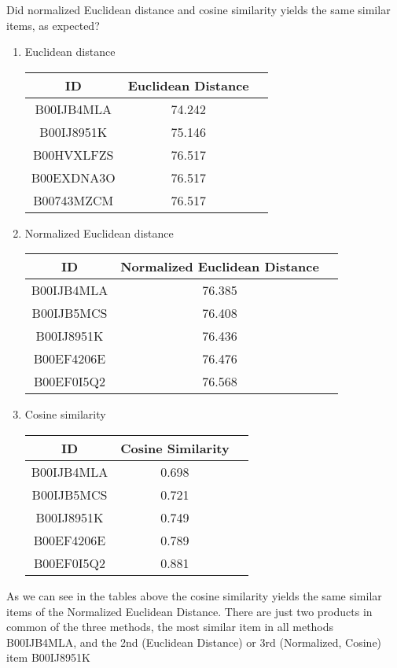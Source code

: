 \documentclass{article}
\def\blu#1{{\color{blu}#1}}
\def\ans#1{{\color{ans}#1}}
\begin{document}
\blu{Did normalized Euclidean distance and cosine similarity yields the same similar items, as expected?}

\begin{enumerate}\color{ans}
\item Euclidean distance
    \scriptsize
    \setlength{\tabcolsep}{10pt}
    \begin{center}
    \begin{tabular}{SSS} \toprule
        {ID} & {Euclidean Distance} & \\ \midrule
        {B00IJB4MLA} & 74.242 \\ 
        {B00IJ8951K} & 75.146 \\ 
        {B00HVXLFZS} & 76.517 \\ 
        {B00EXDNA3O} & 76.517 \\ 
        {B00743MZCM} & 76.517 \\ \bottomrule
    \end{tabular}
    \end{center}
    \normalsize
\item Normalized Euclidean distance
    \scriptsize
    \setlength{\tabcolsep}{10pt}
    \begin{center}
    \begin{tabular}{SSS} \toprule
        {ID} & {Normalized Euclidean Distance} & \\ \midrule
        {B00IJB4MLA} & 76.385 \\ 
        {B00IJB5MCS} & 76.408 \\ 
        {B00IJ8951K} & 76.436 \\ 
        {B00EF4206E} & 76.476 \\ 
        {B00EF0I5Q2} & 76.568 \\ \bottomrule
    \end{tabular}
    \end{center}
    \normalsize
\item Cosine similarity
    \scriptsize
    \setlength{\tabcolsep}{10pt}
    \begin{center}
    \begin{tabular}{SSS} \toprule
        {ID} & {Cosine Similarity} & \\ \midrule
        {B00IJB4MLA} & 0.698 \\ 
        {B00IJB5MCS} & 0.721 \\ 
        {B00IJ8951K} & 0.749 \\ 
        {B00EF4206E} & 0.789 \\ 
        {B00EF0I5Q2} & 0.881 \\ \bottomrule
    \end{tabular}
    \end{center}
    \normalsize
\end{enumerate}
\ans{
    As we can see in the tables above the cosine similarity yields the same similar items of the 
    Normalized Euclidean Distance. There are just two products in common of the three methods, the 
    most similar item in all methods B00IJB4MLA, and the 2nd (Euclidean Distance) or 3rd 
    (Normalized, Cosine) item  B00IJ8951K
}
\end{document}
